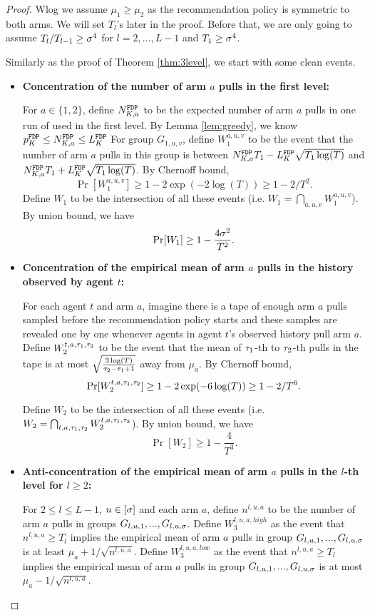 \begin{proof}
Wlog we assume $\mu_1 \geq \mu_2$ as the recommendation policy is symmetric to both arms. We will set $T_l$'s later in the proof. Before that, we are only going to assume $T_l / T_{l-1} \geq \sigma^4$ for $l=2,...,L-1$ and $T_1 \geq \sigma^4$. 

Similarly as the proof of Theorem \ref{thm:3level}, we start with some clean events.

\begin{itemize}
\item  \textbf{Concentration of the number of arm $a$ pulls in the first level:} 

For $a \in \{1,2\}$, define $N^\mathtt{FDP}_{K,a}$ to be the expected number of arm $a$ pulls in one run of \ALGG used in the first level. By Lemma \ref{lem:greedy}, we know $p^\mathtt{FDP}_K \leq N^\mathtt{FDP}_{K,a} \leq L^\mathtt{FDP}_K$ For group $G_{1,u,v}$, define $W_1^{a,u,v}$ to be the event that the number of arm $a$ pulls in this group is between $N^\mathtt{FDP}_{K,a} T_1- L^\mathtt{FDP}_K \sqrt{T_1\log(T)}$ and $N^\mathtt{FDP}_{K,a} T_1 + L^\mathtt{FDP}_K \sqrt{T_1\log(T)}$. By Chernoff bound,
\[
\Pr[W_1^{a,u,v}] \geq 1-2\exp(-2\log(T)) \geq 1-2/T^2.
\]
Define $W_1$ to be the intersection of all these events (i.e. $W_1 = \bigcap_{a,u,v}W_1^{a,u,v}$). By union bound, we have
\[
\Pr[W_1] \geq 1- \frac{4\sigma^2}{T^2}.
\]


\item \textbf{Concentration of the empirical mean of arm $a$ pulls in the history observed by agent $t$:}

 For each agent $t$ and arm $a$, imagine there is a tape of enough arm $a$ pulls sampled before the recommendation policy starts and these samples are revealed one by one whenever agents in agent $t$'s observed history pull arm $a$.  Define $W_2^{t,a,\tau_1,\tau_2}$ to be the event that the mean of $\tau_1$-th to $\tau_2$-th pulls in the tape is at most $\sqrt{\frac{3\log(T)}{\tau_2-\tau_1+1}}$ away from $\mu_a$. By Chernoff bound, 
\[
\Pr[W_2^{t,a,\tau_1,\tau_2}] \geq 1 - 2\exp(-6\log(T)) \geq 1- 2/T^6.
\]

Define $W_2$ to be the intersection of all these events (i.e. $W_2 = \bigcap_{t,a,\tau_1,\tau_2} W_2^{t,a,\tau_1,\tau_2}$). By union bound, we have
\[
\Pr[W_2] \geq 1- \frac{4}{T^3}.
\]


\item \textbf{Anti-concentration of the empirical mean of arm $a$ pulls in the $l$-th level  for $l \geq 2$:}

For $2\leq l \leq L-1$, $u\in [\sigma]$ and each arm $a$, define $n^{l,u,a}$ to be the number of arm $a$ pulls in groups $G_{l,u,1},...,G_{l,u,\sigma}$. Define $W_3^{l,u,a,high}$ as the event that $n^{l,u,a} \geq T_l$ implies the empirical mean of arm $a$ pulls in group $G_{l,u,1},...,G_{l,u,\sigma}$ is at least $\mu_a + 1/\sqrt{n^{l,u,a}}$. Define $W_3^{l,u,a,low}$ as the event that $n^{l,u,a} \geq T_l$ implies the empirical mean of arm $a$ pulls in group $G_{l,u,1},...,G_{l,u,\sigma}$ is at most $\mu_a - 1/\sqrt{n^{l,u,a}}$.


\end{itemize}
\end{proof}
